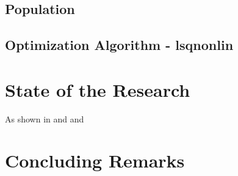 \subsection{Population}
\subsection{Optimization Algorithm  - lsqnonlin}

\section{State of the Research}

As shown in \cite{GeraceThesis}
and \cite{Mobley:2005} and \cite{Lesser}

\section{Concluding Remarks}